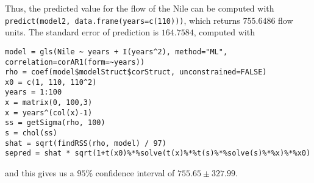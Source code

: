 \documentclass{article}
\DeclareMathOperator{\var}{var}
\begin{document}
Thus, the predicted value for the flow of the Nile can be computed with \verb|predict(model2, data.frame(years=c(110)))|, which returns $755.6486$ flow units. The standard error of prediction is $164.7584$, computed with
\begin{verbatim}
model = gls(Nile ~ years + I(years^2), method="ML", correlation=corAR1(form=~years))
rho = coef(model$modelStruct$corStruct, unconstrained=FALSE)
x0 = c(1, 110, 110^2)
years = 1:100
x = matrix(0, 100,3)
x = years^(col(x)-1)
ss = getSigma(rho, 100)
s = chol(ss)
shat = sqrt(findRSS(rho, model) / 97)
sepred = shat * sqrt(1+t(x0)%*%solve(t(x)%*%t(s)%*%solve(s)%*%x)%*%x0)
\end{verbatim}
and this gives us a $95\%$ confidence interval of $755.65\pm327.99$.
\end{document}
